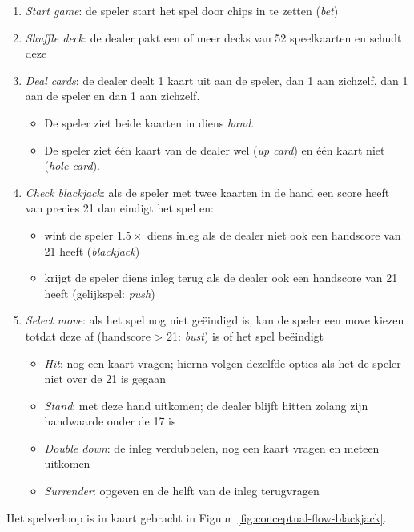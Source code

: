 \begin{enumerate}
    \item \textit{Start game}: de speler start het spel door chips in te zetten (\textit{bet})
    \item \textit{Shuffle deck}: de dealer pakt een of meer decks van 52 speelkaarten en schudt deze 
    \item \textit{Deal cards}: de dealer deelt 1 kaart uit aan de speler, dan 1 aan zichzelf, dan 1 aan de speler en dan 1 aan zichzelf.
        \begin{itemize}
            \item De speler ziet beide kaarten in diens \textit{hand}.
            \item De speler ziet één kaart van de dealer wel (\textit{up card}) en één kaart niet (\textit{hole card}).
        \end{itemize}
    \item \textit{Check blackjack}: als de speler met twee kaarten in de hand een score heeft van precies 21
        dan eindigt het spel en:
        \begin{itemize}
            \item wint de speler $1.5\times$ diens inleg als de dealer niet ook een handscore van 21 heeft (\textit{blackjack})
            \item krijgt de speler diens inleg terug als de dealer ook een handscore van 21 heeft (gelijkspel: \textit{push})
        \end{itemize}
    \item \textit{Select move}: als het spel nog niet geëindigd is, kan de speler een move kiezen totdat deze af 
    (handscore > 21: \textit{bust}) is of het spel beëindigt
        \begin{itemize}
            \item \textit{Hit}: nog een kaart vragen; hierna volgen dezelfde opties als het de speler niet over de 21 is gegaan
            \item \textit{Stand}: met deze hand uitkomen; de dealer blijft hitten zolang zijn handwaarde onder de 17 is
            \item \textit{Double down}: de inleg verdubbelen, nog een kaart vragen en meteen uitkomen 
            \item \textit{Surrender}: opgeven en de helft van de inleg terugvragen 
        \end{itemize}
\end{enumerate}

Het spelverloop is in kaart gebracht in Figuur~\ref{fig:conceptual-flow-blackjack}.

